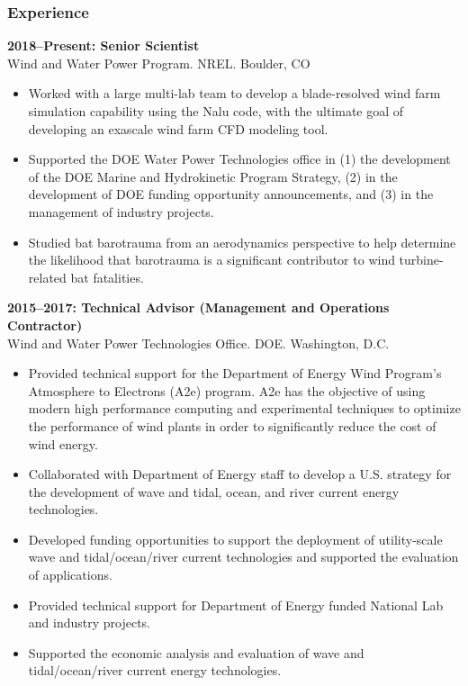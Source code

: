 \subsubsection*{Experience}
\vspace{-0.15in}

\textbf{2018--Present: Senior Scientist} \\
Wind and Water Power Program. NREL. Boulder, CO\\
\vspace{-0.35in}
\begin{itemize}
  \item Worked with a large multi-lab team to develop a blade-resolved wind farm simulation capability using the Nalu code, with the ultimate goal of developing an exascale wind farm CFD modeling tool.
  \vspace{-0.1in}
  \item Supported the DOE Water Power Technologies office in (1) the development of the DOE Marine and Hydrokinetic Program Strategy, (2) in the development of DOE funding opportunity announcements, and (3) in the management of industry projects.
  \vspace{-0.1in}
  \item Studied bat barotrauma from an aerodynamics perspective to help determine the likelihood that barotrauma is a significant contributor to wind turbine-related bat fatalities.
\end{itemize}
\vspace{-0.2in}
\textbf{2015--2017: Technical Advisor (Management and Operations Contractor)}\\
Wind and Water Power Technologies Office. DOE. Washington, D.C.\\
\vspace{-0.35in}
\begin{itemize}
  \item Provided technical support for the Department of Energy Wind Program’s Atmosphere to Electrons (A2e) program. A2e has the objective of using modern high performance computing and experimental techniques to optimize the performance of wind plants in order to significantly reduce the cost of wind energy.
  \vspace{-0.1in}
  \item Collaborated with Department of Energy staff to develop a U.S. strategy for the development of wave and tidal, ocean, and river current energy technologies.
  \vspace{-0.1in}
  \item Developed funding opportunities to support the deployment of utility-scale wave and tidal/ocean/river current technologies and supported the evaluation of applications.
  \vspace{-0.1in}
  \item Provided technical support for Department of Energy funded National Lab and industry projects.
  \vspace{-0.1in}
  \item Supported the economic analysis and evaluation of wave and tidal/ocean/river current energy technologies.
\end{itemize}

